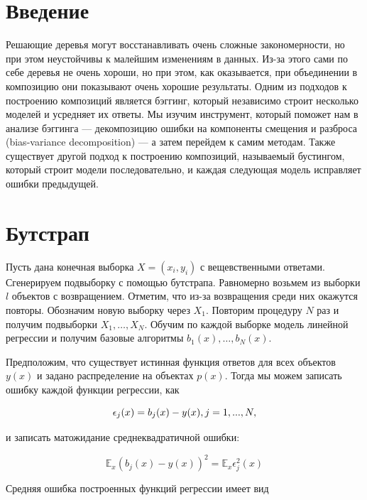 \documentclass{article}
\begin{document}
\tableofcontents

\newpage

\section{Введение}

Решающие деревья могут восстанавливать очень сложные закономерности, но при этом неустойчивы к малейшим изменениям в данных. Из-за этого сами по себе деревья не очень хороши, но при этом, как оказывается, при объединении в композицию они показывают очень хорошие результаты. Одним из подходов к построению композиций является бэггинг, который независимо строит несколько моделей и усредняет их ответы. Мы изучим инструмент, который поможет нам в анализе бэггинга --- декомпозицию ошибки на компоненты смещения и разброса (bias-variance decomposition) — а затем перейдем к самим методам. Также существует другой подход к построению композиций, называемый бустингом, который строит модели последовательно, и каждая следующая модель исправляет ошибки предыдущей.

\section{Бутстрап}

Пусть дана конечная выборка $X = (x_i,y_i)$ с вещевственными ответами. Сгенерируем подвыборку с помощью бутстрапа. Равномерно возьмем из выборки $l$ объектов с возвращением. Отметим, что из-за возвращения среди них окажутся повторы. Обозначим новую выборку через $X_1$. Повторим процедуру $N$ раз и получим подвыборки $X_1,\ldots,X_N$. Обучим по каждой выборке модель линейной регрессии и получим базовые алгоритмы $b_1(x),\ldots,b_N(x)$.

Предположим, что существует истинная функция ответов для всех объектов $y(x)$ и задано распределение на объектах $p(x)$. Тогда мы можем записать ошибку каждой функции регрессии, как 

\begin{equation}
	\epsilon_j(x)=b_j(x)-y(x),\space j = 1,...,N,
\end{equation}

и записать матожидание среднеквадратичной ошибки:

\begin{equation}
	\mathbb{E}_x\left(b_j(x) - y(x)\right)^2 = \mathbb{E}_x\epsilon^2_j(x)
\end{equation}

Средняя ошибка построенных функций регрессии имеет вид
\end{document}
